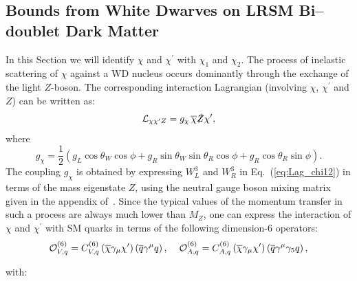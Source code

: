 \documentclass[11pt]{article}
\begin{document}
\subsection{Bounds from White Dwarves on LRSM Bi--doublet Dark Matter }
\label{sec:LR_WD_bounds}
In this Section we will identify $\chi$ and $\chi^{\prime}$ with 
$\chi_1$ and $\chi_2$. The process of inelastic scattering of $\chi$ against a WD nucleus occurs dominantly through the exchange of the light $Z$-boson. The corresponding interaction Lagrangian (involving $\chi$, $\chi^{\prime}$ and $Z$) can be written as:
\begin{equation}
\mathcal{L}_{\chi \chi^{\prime} Z} = g_{\chi} \hspace{0.5mm} \overline{\chi} \slashed{Z} \chi^{\prime} ,
\label{eq:Lag_chi_Z}
\end{equation}
where
\begin{equation}
g_{\chi} = \frac{1}{2} \left( g_L \cos\theta_W \cos\phi + g_R \sin\theta_W \sin\theta_R \cos\phi + g_R \cos\theta_R \sin\phi \right) .
\label{eq:g_chi}
\end{equation}
The coupling $g_{\chi}$ is obtained by expressing $W^3_L$ and $W^3_R$ in Eq.~(\ref{eq:Lag_chi12}) in terms of the mass eigenstate $Z$, 
using the neutral gauge boson mixing matrix given 
in the appendix of~\cite{Garcia-Cely_LR_pheno}.
Since the typical values of the momentum transfer in such a process are always much lower than $M_{Z}$, one can express the interaction of $\chi$ and $\chi^{\prime}$ with SM quarks in terms of the following dimension-6 operators:
\begin{equation}
\mathcal{O}^{(6)}_{V,q} = C^{(6)}_{V,q}\left( \overline{\chi} \gamma_\mu \chi^{\prime} \right)
\left( \overline{q} \gamma^\mu q \right) , \hspace{4mm}
\mathcal{O}^{(6)}_{A,q} =C^{(6)}_{A,q}\left( \overline{\chi} \gamma_\mu \chi^{\prime} \right)
\left( \overline{q} \gamma^\mu \gamma_5 q \right) ,
\label{eq:Lag_chi_q}
\end{equation}

\noindent with:
\end{document}
